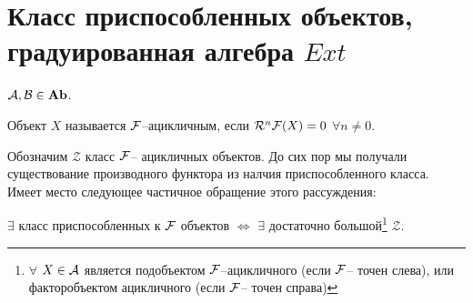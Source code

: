 \documentclass[../main.tex]{subfiles}
\begin{document}
\section{Класс приспособленных объектов, градуированная алгебра $Ext$}
$\mathcal{A}, \mathcal{B} \in \mathbf{Ab}$. 
\begin{to_def}
Объект $X$ называется $\mathcal{F}$--ацикличным, если $\mathcal{R}^{n}\mathcal{F}(X) = 0$ $\forall n\neq 0$.
\end{to_def}
Обозначим $\mathcal{Z}$ класс $\mathcal{F}$-- ацикличных объектов. До сих пор мы получали существование производного функтора из налчия приспособленного класса. Имеет место следующее частичное обращение этого рассуждения:
\begin{to_claim}
$\exists$ класс приспособленных к $\mathcal{F}$ объектов $\Leftrightarrow$
    $\exists$ достаточно большой\footnote{$\forall$ $X \in \mathcal{A}$ является подобъектом $\mathcal{F}$--ацикличного (если $\mathcal{F}$-- точен слева), или факторобъектом ацикличного (если $\mathcal{F}$-- точен справа)} $\mathcal{Z}$.
\end{to_claim}
\end{document}
